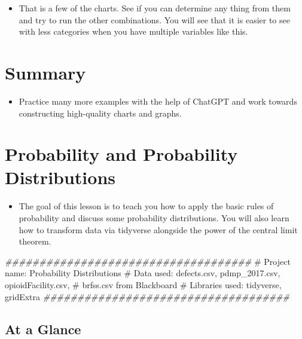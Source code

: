 \documentclass[
  letterpaper,
  DIV=11,
  numbers=noendperiod]{scrreprt}
\newenvironment{Shaded}{\begin{snugshade}}{\end{snugshade}}
\newcommand{\CommentTok}[1]{\textcolor[rgb]{0.37,0.37,0.37}{#1}}
\newcommand{\DocumentationTok}[1]{\textcolor[rgb]{0.37,0.37,0.37}{\textit{#1}}}
\providecommand{\tightlist}{%
  \setlength{\itemsep}{0pt}\setlength{\parskip}{0pt}}\usepackage{longtable,booktabs,array}
\begin{document}
\begin{itemize}
\tightlist
\item
  That is a few of the charts. See if you can determine any thing from
  them and try to run the other combinations. You will see that it is
  easier to see with less categories when you have multiple variables
  like this.
\end{itemize}


\chapter{Summary}\label{summary-4}

\begin{itemize}
\tightlist
\item
  Practice many more examples with the help of ChatGPT and work towards
  constructing high-quality charts and graphs.
\end{itemize}


\chapter{Probability and Probability
Distributions}\label{probability-and-probability-distributions}

\begin{itemize}
\tightlist
\item
  The goal of this lesson is to teach you how to apply the basic rules
  of probability and discuss some probability distributions. You will
  also learn how to transform data via tidyverse alongside the power of
  the central limit theorem.
\end{itemize}

\begin{Shaded}
\begin{Highlighting}[]
\DocumentationTok{\#\#\#\#\#\#\#\#\#\#\#\#\#\#\#\#\#\#\#\#\#\#\#\#\#\#\#\#\#\#\#\#\#\#\#\#}
\CommentTok{\# Project name: Probability Distributions}
\CommentTok{\# Data used: defects.csv, pdmp\_2017.csv, opioidFacility.csv,}
\CommentTok{\# brfss.csv from Blackboard}
\CommentTok{\# Libraries used: tidyverse, gridExtra}
\DocumentationTok{\#\#\#\#\#\#\#\#\#\#\#\#\#\#\#\#\#\#\#\#\#\#\#\#\#\#\#\#\#\#\#\#\#\#\#\#}
\end{Highlighting}
\end{Shaded}

\section{At a Glance}\label{at-a-glance-3}
\end{document}
